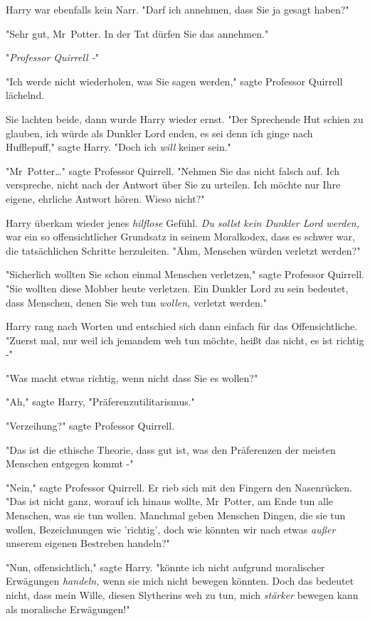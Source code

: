 {Harry war ebenfalls kein Narr. "Darf ich annehmen, dass Sie ja gesagt haben?"

"Sehr gut, Mr~Potter. In der Tat dürfen Sie das annehmen."

"\emph{Professor Quirrell -}"

"Ich werde nicht wiederholen, was Sie sagen werden," sagte Professor Quirrell lächelnd.

Sie lachten beide, dann wurde Harry wieder ernst. "Der Sprechende Hut schien zu glauben, ich würde als Dunkler Lord enden, es sei denn ich ginge nach Hufflepuff," sagte Harry. "Doch ich \emph{will} keiner sein."

"Mr~Potter…" sagte Professor Quirrell. "Nehmen Sie das nicht falsch auf. Ich verspreche, nicht nach der Antwort über Sie zu urteilen. Ich möchte nur Ihre eigene, ehrliche Antwort hören. Wieso nicht?"

Harry überkam wieder jenes \emph{hilflose} Gefühl. \emph{Du sollst kein Dunkler Lord werden,} war ein so offensichtlicher Grundsatz in seinem Moralkodex, dass es schwer war, die tatsächlichen Schritte herzuleiten. "Ähm, Menschen würden verletzt werden?"

"Sicherlich wollten Sie schon einmal Menschen verletzen," sagte Professor Quirrell. "Sie wollten diese Mobber heute verletzen. Ein Dunkler Lord zu sein bedeutet, dass Menschen, denen Sie weh tun \emph{wollen,} verletzt werden."

Harry rang nach Worten und entschied sich dann einfach für das Offensichtliche. "Zuerst mal, nur weil ich jemandem weh tun möchte, heißt das nicht, es ist richtig -"

"Was macht etwas richtig, wenn nicht dass Sie es wollen?"

"Ah," sagte Harry, "Präferenzutilitarismus."

"Verzeihung?" sagte Professor Quirrell.

"Das ist die ethische Theorie, dass gut ist, was den Präferenzen der meisten Menschen entgegen kommt -"

"Nein," sagte Professor Quirrell. Er rieb sich mit den Fingern den Nasenrücken. "Das ist nicht ganz, worauf ich hinaus wollte, Mr~Potter, am Ende tun alle Menschen, was sie tun wollen. Manchmal geben Menschen Dingen, die sie tun wollen, Bezeichnungen wie 'richtig', doch wie könnten wir nach etwas \emph{außer} unserem eigenen Bestreben handeln?"

"Nun, offensichtlich," sagte Harry. "könnte ich nicht aufgrund moralischer Erwägungen \emph{handeln,} wenn sie mich nicht bewegen könnten. Doch das bedeutet nicht, dass mein Wille, diesen Slytherins weh zu tun, mich \emph{stärker} bewegen kann als moralische Erwägungen!"

}
